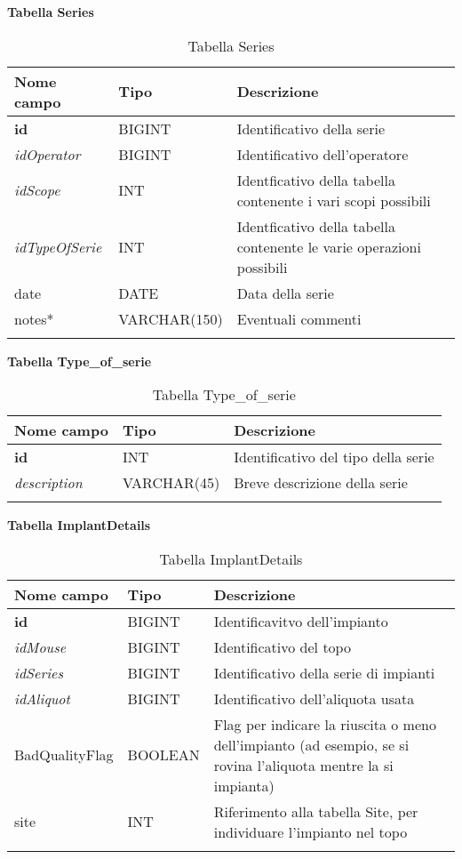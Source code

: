 \textbf{Tabella Series}

\begin{longtable}{|l|l|p{5.5cm}|}
\hline
\textbf{Nome campo} &	\textbf{Tipo} &	\textbf{Descrizione}\\ \hline
\textbf{id} &	BIGINT &	Identificativo della serie\\ \hline
\textit{idOperator} &	BIGINT &	Identificativo dell'operatore\\ \hline
\textit{idScope} &	INT &	Identficativo della tabella contenente i vari scopi possibili\\ \hline
\textit{idTypeOfSerie} &	INT &	Identficativo della tabella contenente le varie operazioni possibili\\ \hline
date &	DATE &	Data della serie\\ \hline
notes* &	VARCHAR(150) &	Eventuali commenti\\ \hline
\caption{Tabella Series}
\end{longtable}

\textbf{Tabella Type\_of\_serie}

\begin{longtable}{|l|l|p{5.5cm}|}
\hline
\textbf{Nome campo} &	\textbf{Tipo} &	\textbf{Descrizione}\\ \hline
\textbf{id} &	INT &	Identificativo del tipo della serie\\ \hline
\textit{description} &	VARCHAR(45) &	Breve descrizione della serie \\ \hline
\caption{Tabella Type\_of\_serie}
\end{longtable}

\textbf{Tabella ImplantDetails}

\begin{longtable}{|l|l|p{7.0cm}|}
\hline
\textbf{Nome campo} &	\textbf{Tipo} &	\textbf{Descrizione}\\ \hline
\textbf{id} &	BIGINT &	Identificavitvo dell'impianto\\ \hline
\textit{idMouse} &	BIGINT &	Identificativo del topo\\ \hline
\textit{idSeries} &	BIGINT &	Identificativo della serie di impianti\\ \hline
\textit{idAliquot} &	BIGINT &	Identificativo dell'aliquota usata\\ \hline
BadQualityFlag &	BOOLEAN &	Flag per indicare la riuscita o meno dell'impianto (ad esempio, se si rovina l'aliquota mentre la si impianta)\\ \hline
site & INT & Riferimento alla tabella Site, per individuare l'impianto nel topo\\ \hline
\caption{Tabella ImplantDetails}
\end{longtable}

